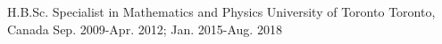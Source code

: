

\begin{cventries}

  \cventry
    {H.B.Sc. Specialist in Mathematics and Physics} %
    {University of Toronto} %
    {Toronto, Canada} %
    {Sep. 2009-Apr. 2012; Jan. 2015-Aug. 2018} %
    {
    }

\end{cventries}
